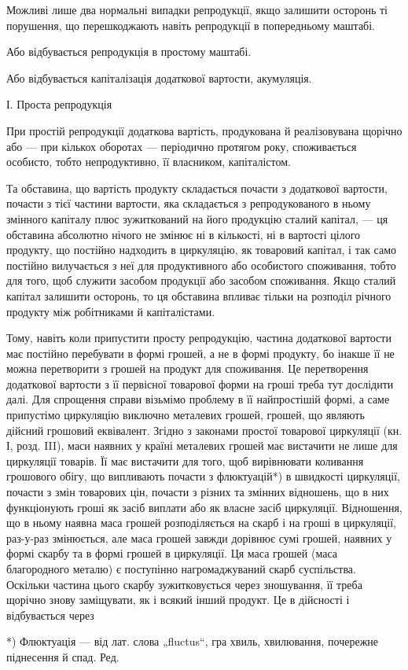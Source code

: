Можливі лише два нормальні випадки репродукції, якщо залишити
осторонь ті порушення, що перешкоджають навіть репродукції в попередньому
маштабі.

Або відбувається репродукція в простому маштабі.

Або відбувається капіталізація додаткової вартости, акумуляція.

І. Проста репродукція

При простій репродукції додаткова вартість, продукована й реалізовувана
щорічно або — при кількох оборотах — періодично протягом року,
споживається особисто, тобто непродуктивно, її власником, капіталістом.

Та обставина, що вартість продукту складається почасти з додаткової
вартости, почасти з тієї частини вартости, яка складається з репродукованого
в ньому змінного капіталу плюс зужиткований на його продукцію
сталий капітал, — ця обставина абсолютно нічого не змінює ні в кількості,
ні в вартості цілого продукту, що постійно надходить в циркуляцію, як
товаровий капітал, і так само постійно вилучається з неї для продуктивного
або особистого споживання, тобто для того, щоб служити засобом
продукції або засобом споживання. Якщо сталий капітал залишити осторонь,
то ця обставина впливає тільки на розподіл річного продукту між
робітниками й капіталістами.

Тому, навіть коли припустити просту репродукцію, частина додаткової
вартости має постійно перебувати в формі грошей, а не в формі
продукту, бо інакше її не можна перетворити з грошей на продукт для
споживання. Це перетворення додаткової вартости з її первісної товарової
форми на гроші треба тут дослідити далі. Для спрощення справи
візьмімо проблему в її найпростішій формі, а саме припустімо циркуляцію
виключно металевих грошей, грошей, що являють дійсний грошовий еквівалент.
Згідно з законами простої товарової циркуляції (кн. І, розд. III), маси
наявних у країні металевих грошей має вистачити не лише для
циркуляції товарів. Її має вистачити для того, щоб вирівнювати коливання
грошового обігу, що випливають почасти з флюктуацій*) в швидкості
циркуляції, почасти з змін товарових цін, почасти з різних та
змінних відношень, що в них функціонують гроші як засіб виплати або
як власне засіб циркуляції. Відношення, що в ньому наявна маса грошей
розподіляється на скарб і на гроші в циркуляції, раз-у-раз змінюється, але
маса грошей завжди дорівнює сумі грошей, наявних у формі скарбу та
в формі грошей в циркуляції. Ця маса грошей (маса благородного металю)
є поступінно нагромаджуваний скарб суспільства. Оскільки частина цього
скарбу зужитковується через зношування, її треба щорічно знову заміщувати,
як і всякий інший продукт. Це в дійсності і відбувається через

*) Флюктуація — від лат. слова „fluctus“, гра хвиль, хвилювання, почережне
піднесення й спад. Ред.
